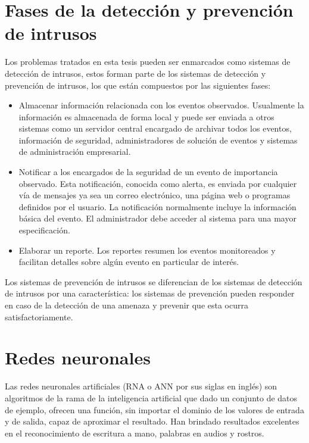 \section{Fases de la detección y prevención de intrusos}
Los problemas tratados en esta tesis pueden ser enmarcados como sistemas de detección de intrusos, estos forman parte de los sistemas de detección y prevención de intrusos, los que están compuestos por las siguientes fases:

\begin{itemize}
    \sloppy
    \item Almacenar información relacionada con los eventos observados. Usualmente la información es almacenada de forma local y puede ser enviada a otros sistemas como un servidor central encargado de archivar todos los eventos, información de seguridad, administradores de solución de eventos y sistemas de administración empresarial.
    \item Notificar a los encargados de la seguridad de un evento de importancia observado. Esta notificación, conocida como alerta, es enviada por cualquier vía de mensajes ya sea un correo electrónico, una página web o programas definidos por el usuario. La notificación normalmente incluye la información básica del evento. El administrador debe acceder al sistema para una mayor especificación.
    \item Elaborar un reporte. Los reportes resumen los eventos monitoreados y facilitan detalles sobre algún evento en particular de interés.
\end{itemize}

Los sistemas de prevención de intrusos se diferencian de los sistemas de detección de intrusos por una característica: los sistemas de prevención pueden responder en caso de la detección de una amenaza y prevenir que esta ocurra satisfactoriamente.

\section{Redes neuronales}

Las redes neuronales artificiales (RNA o ANN por sus siglas en inglés) son algoritmos de la rama de la inteligencia artificial que dado un conjunto de datos de ejemplo, ofrecen una función, sin importar el dominio de los valores de entrada y de salida, capaz de aproximar el resultado. Han brindado resultados excelentes en el reconocimiento de escritura a mano, palabras en audios y rostros.


